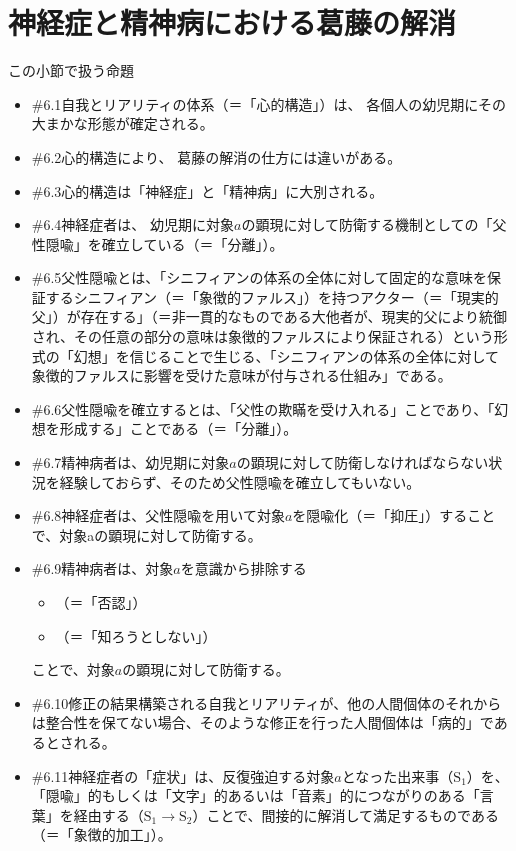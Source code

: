 \section{神経症と精神病における葛藤の解消}\label{ux795eux7d4cux75c7ux3068ux7cbeux795eux75c5ux306bux304aux3051ux308bux845bux85e4ux306eux89e3ux6d88}

\begin{note}{この小節で扱う命題}
  \begin{itemize}
    \tightlist
    \item{\#6.1}自我とリアリティの体系（＝「心的構造」）は、  各個人の幼児期にその大まかな形態が確定される。
    \item{\#6.2}心的構造により、  葛藤の解消の仕方には違いがある。
    \item{\#6.3}心的構造は「神経症」と「精神病」に大別される。
    \item{\#6.4}神経症者は、  幼児期に対象$a$の顕現に対して防衛する機制としての「父性隠喩」を確立している（＝「分離」）。
    \item{\#6.5}父性隠喩とは、「シニフィアンの体系の全体に対して固定的な意味を保証するシニフィアン（＝「象徴的ファルス」）を持つアクター（＝「現実的父」）が存在する」（＝非一貫的なものである大他者が、現実的父により統御され、その任意の部分の意味は象徴的ファルスにより保証される）という形式の「幻想」を信じることで生じる、「シニフィアンの体系の全体に対して象徴的ファルスに影響を受けた意味が付与される仕組み」である。
    \item{\#6.6}父性隠喩を確立するとは、「父性の欺瞞を受け入れる」ことであり、「幻想を形成する」ことである（＝「分離」）。
    \item{\#6.7}精神病者は、幼児期に対象$a$の顕現に対して防衛しなければならない状況を経験しておらず、そのため父性隠喩を確立してもいない。
    \item{\#6.8}神経症者は、父性隠喩を用いて対象$a$を隠喩化（＝「抑圧」）することで、対象aの顕現に対して防衛する。
    \item{\#6.9}精神病者は、対象$a$を意識から排除する
      \begin{itemize}
        \tightlist
        \item （＝「否認」）
        \item （＝「知ろうとしない」）
      \end{itemize}ことで、対象$a$の顕現に対して防衛する。
    \item{\#6.10}修正の結果構築される自我とリアリティが、他の人間個体のそれからは整合性を保てない場合、そのような修正を行った人間個体は「病的」であるとされる。
    \item{\#6.11}神経症者の「症状」は、反復強迫する対象$a$となった出来事（$\textrm{S}_1$）を、「隠喩」的もしくは「文字」的あるいは「音素」的につながりのある「言葉」を経由する（$\textrm{S}_1\rightarrow\textrm{S}_2$）ことで、間接的に解消して満足するものである（＝「象徴的加工」）。

\end{itemize}
\end{note}
